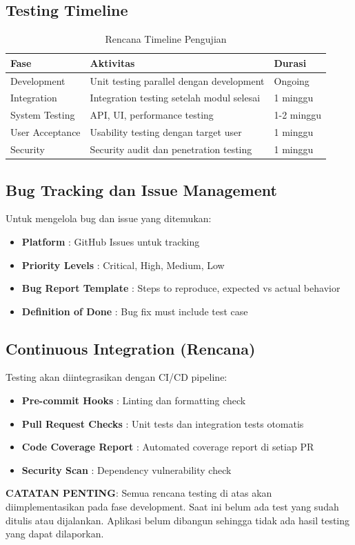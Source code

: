 \subsection{Testing Timeline}

\begin{table}[H]
\centering
\caption{Rencana Timeline Pengujian}
\label{tab:testing_timeline}
\begin{tabularx}{\textwidth}{|l|X|l|}
\hline
\textbf{Fase} & \textbf{Aktivitas} & \textbf{Durasi} \\
\hline
Development & Unit testing parallel dengan development & Ongoing \\
\hline
Integration & Integration testing setelah modul selesai & 1 minggu \\
\hline
System Testing & API, UI, performance testing & 1-2 minggu \\
\hline
User Acceptance & Usability testing dengan target user & 1 minggu \\
\hline
Security & Security audit dan penetration testing & 1 minggu \\
\hline
\end{tabularx}
\end{table}

\subsection{Bug Tracking dan Issue Management}

Untuk mengelola bug dan issue yang ditemukan:

\begin{itemize}[leftmargin=*]
    \item \textbf{Platform} : GitHub Issues untuk tracking
    \item \textbf{Priority Levels} : Critical, High, Medium, Low
    \item \textbf{Bug Report Template} : Steps to reproduce, expected vs actual behavior
    \item \textbf{Definition of Done} : Bug fix must include test case
\end{itemize}

\subsection{Continuous Integration (Rencana)}

Testing akan diintegrasikan dengan CI/CD pipeline:

\begin{itemize}[leftmargin=*]
    \item \textbf{Pre-commit Hooks} : Linting dan formatting check
    \item \textbf{Pull Request Checks} : Unit tests dan integration tests otomatis
    \item \textbf{Code Coverage Report} : Automated coverage report di setiap PR
    \item \textbf{Security Scan} : Dependency vulnerability check
\end{itemize}

\textbf{CATATAN PENTING}: Semua rencana testing di atas akan diimplementasikan pada fase development. Saat ini belum ada test yang sudah ditulis atau dijalankan. Aplikasi belum dibangun sehingga tidak ada hasil testing yang dapat dilaporkan.
